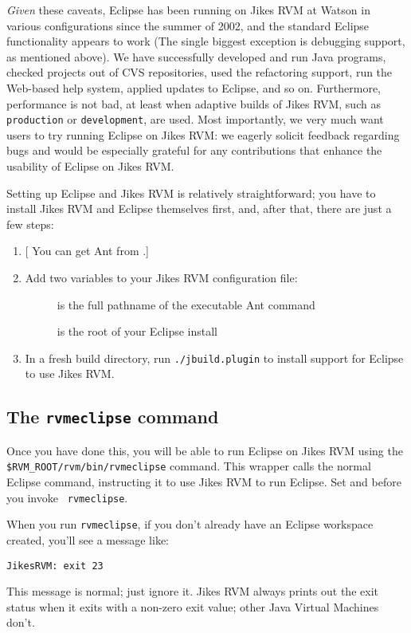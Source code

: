 {\it Given} these caveats, Eclipse has been running on Jikes RVM at
Watson in various configurations since the summer of 2002, and the
standard Eclipse functionality appears to work (The single biggest
exception is debugging support, as mentioned above).  We have
successfully developed and run Java programs, checked projects out of
CVS repositories, used the refactoring support, run the Web-based help
system, applied updates to Eclipse, and so on.  Furthermore,
performance is not bad, at least when adaptive builds of Jikes RVM,
such as {\tt production} or {\tt development}, are used.  Most
importantly, we very much want users to try running Eclipse on Jikes
RVM: we eagerly solicit feedback regarding bugs and would be
especially grateful for any contributions that enhance the usability
of Eclipse on Jikes RVM.\@

Setting up Eclipse and Jikes RVM is relatively straightforward; you
have to install Jikes RVM and Eclipse themselves first, and, after
that, there are just a few steps:
\begin{enumerate}
\item {}[  You can get Ant from {\tt \antURL}.]{\antURL} 
\item Add two variables to your Jikes RVM configuration file:
 \begin{description}
 \item[] is the full pathname of the executable Ant command
 \item[] is the root of your Eclipse install
 \end{description}
\item In a fresh build directory, run {\tt ./jbuild.plugin} to install
support for Eclipse to use Jikes RVM.\@
\end{enumerate}

\subsection{The {\tt rvmeclipse} command}

%
Once you have done this, you will be able to run Eclipse on Jikes RVM
using the {\tt \$RVM\_\-ROOT/\-rvm/\-bin/\-rvmeclipse} command.  This wrapper
calls the normal Eclipse command, instructing it to use Jikes RVM to
run Eclipse.  Set  and  before you invoke {\tt
rvmeclipse}.

When you run {\tt rvmeclipse}, if you don't already
have an Eclipse workspace created, you'll see a message like:
\begin{example}
{\tt JikesRVM: exit 23}
\end{example}
This message is normal; just ignore it.  Jikes RVM always prints out
the exit status when it exits with a non-zero exit value; other Java\TMweb{}
Virtual Machines don't.

